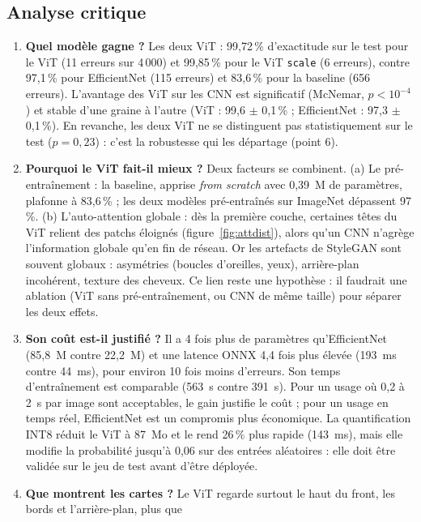 \documentclass[11pt,a4paper]{article}
\begin{document}
\subsection{Analyse critique}

\begin{enumerate}
  \item \textbf{Quel modèle gagne ?} Les deux ViT : 99,72\,\% d'exactitude sur le test pour le ViT (11 erreurs sur 4\,000) et
        99,85\,\% pour le ViT \texttt{scale} (6 erreurs), contre 97,1\,\% pour EfficientNet (115 erreurs) et 83,6\,\% pour la
        baseline (656 erreurs). L'avantage des ViT sur les CNN est significatif (McNemar, $p<10^{-4}$) et stable d'une
        graine à l'autre (ViT : 99,6 $\pm$ 0,1\,\% ; EfficientNet : 97,3 $\pm$ 0,1\,\%). En revanche, les deux ViT ne se
        distinguent pas statistiquement sur le test ($p=0{,}23$) : c'est la robustesse qui les départage (point 6).
  \item \textbf{Pourquoi le ViT fait-il mieux ?} Deux facteurs se combinent. (a) Le pré-entraînement : la baseline, apprise
        \emph{from scratch} avec 0,39~M de paramètres, plafonne à 83,6\,\% ; les deux modèles pré-entraînés sur ImageNet
        dépassent 97\,\%. (b) L'auto-attention globale : dès la première couche, certaines têtes du ViT relient des patchs
        éloignés (figure~\ref{fig:attdist}), alors qu'un CNN n'agrège l'information globale qu'en fin de réseau. Or les
        artefacts de StyleGAN sont souvent globaux : asymétries (boucles d'oreilles, yeux), arrière-plan incohérent,
        texture des cheveux. Ce lien reste une hypothèse : il faudrait une ablation (ViT sans pré-entraînement, ou CNN de
        même taille) pour séparer les deux effets.
  \item \textbf{Son coût est-il justifié ?} Il a 4 fois plus de paramètres qu'EfficientNet (85,8~M contre 22,2~M) et une
        latence ONNX 4,4 fois plus élevée (193~ms contre 44~ms), pour environ 10 fois moins d'erreurs. Son temps
        d'entraînement est comparable (563~s contre 391~s). Pour un usage où 0,2 à 2~s par image sont acceptables, le gain
        justifie le coût ; pour un usage en temps réel, EfficientNet est un compromis plus économique. La quantification
        INT8 réduit le ViT à 87~Mo et le rend 26\,\% plus rapide (143~ms), mais elle modifie la probabilité jusqu'à 0,06 sur
        des entrées aléatoires : elle doit être validée sur le jeu de test avant d'être déployée.
  \item \textbf{Que montrent les cartes ?} Le ViT regarde surtout le haut du front, les bords et l'arrière-plan, plus que

\end{enumerate}
\end{document}
